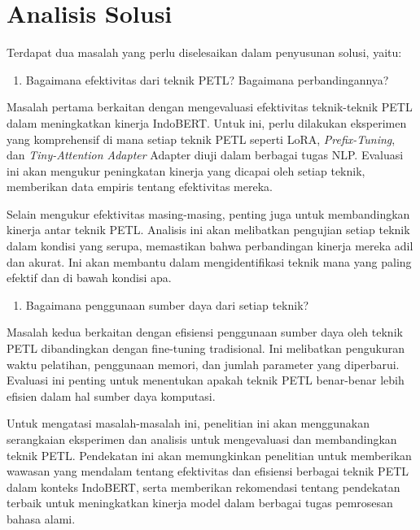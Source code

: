 \section{Analisis Solusi}

Terdapat dua masalah yang perlu diselesaikan dalam penyusunan solusi, yaitu:

\begin{enumerate}
    \item Bagaimana efektivitas dari teknik PETL? Bagaimana perbandingannya?
\end{enumerate}

Masalah pertama berkaitan dengan mengevaluasi efektivitas teknik-teknik PETL dalam meningkatkan kinerja IndoBERT. Untuk ini, perlu dilakukan eksperimen yang komprehensif di mana setiap teknik PETL seperti LoRA, \textit{Prefix-Tuning}, dan \textit{Tiny-Attention Adapter} Adapter diuji dalam berbagai tugas NLP. Evaluasi ini akan mengukur peningkatan kinerja yang dicapai oleh setiap teknik, memberikan data empiris tentang efektivitas mereka.

Selain mengukur efektivitas masing-masing, penting juga untuk membandingkan kinerja antar teknik PETL. Analisis ini akan melibatkan pengujian setiap teknik dalam kondisi yang serupa, memastikan bahwa perbandingan kinerja mereka adil dan akurat. Ini akan membantu dalam mengidentifikasi teknik mana yang paling efektif dan di bawah kondisi apa.

\begin{enumerate}[resume]
    \item Bagaimana penggunaan sumber daya dari setiap teknik?
\end{enumerate}

Masalah kedua berkaitan dengan efisiensi penggunaan sumber daya oleh teknik PETL dibandingkan dengan fine-tuning tradisional. Ini melibatkan pengukuran waktu pelatihan, penggunaan memori, dan jumlah parameter yang diperbarui. Evaluasi ini penting untuk menentukan apakah teknik PETL benar-benar lebih efisien dalam hal sumber daya komputasi.

Untuk mengatasi masalah-masalah ini, penelitian ini akan menggunakan serangkaian eksperimen dan analisis untuk mengevaluasi dan membandingkan teknik PETL. Pendekatan ini akan memungkinkan penelitian untuk memberikan wawasan yang mendalam tentang efektivitas dan efisiensi berbagai teknik PETL dalam konteks IndoBERT, serta memberikan rekomendasi tentang pendekatan terbaik untuk meningkatkan kinerja model dalam berbagai tugas pemrosesan bahasa alami.
